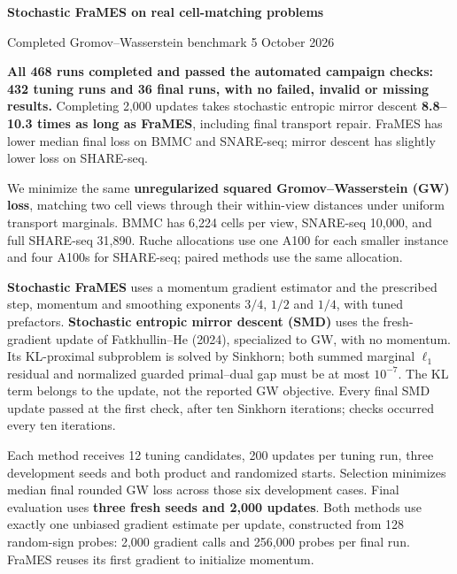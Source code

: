 \documentclass[11pt,a4paper]{article}
\begin{document}
{\color{ink}\fontsize{17}{20}\selectfont\bfseries Stochastic FraMES on real cell-matching problems\par}
{\small Completed Gromov--Wasserstein benchmark \hfill 5 October 2026\par}
\vspace{3pt}

\textbf{All 468 runs completed and passed the automated campaign checks: 432 tuning runs and 36 final runs, with no failed, invalid or missing results.} Completing 2,000 updates takes stochastic entropic mirror descent \textbf{8.8--10.3 times as long as FraMES}, including final transport repair. FraMES has lower median final loss on BMMC and SNARE-seq; mirror descent has slightly lower loss on SHARE-seq.

We minimize the same \textbf{unregularized squared Gromov--Wasserstein (GW) loss}, matching two cell views through their within-view distances under uniform transport marginals. BMMC has 6,224 cells per view, SNARE-seq 10,000, and full SHARE-seq 31,890. Ruche allocations use one A100 for each smaller instance and four A100s for SHARE-seq; paired methods use the same allocation.

\textbf{Stochastic FraMES} uses a momentum gradient estimator and the prescribed step, momentum and smoothing exponents $3/4$, $1/2$ and $1/4$, with tuned prefactors. \textbf{Stochastic entropic mirror descent (SMD)} uses the fresh-gradient update of Fatkhullin--He (2024), specialized to GW, with no momentum. Its KL-proximal subproblem is solved by Sinkhorn; both summed marginal $\ell_1$ residual and normalized guarded primal--dual gap must be at most $10^{-7}$. The KL term belongs to the update, not the reported GW objective. Every final SMD update passed at the first check, after ten Sinkhorn iterations; checks occurred every ten iterations.

Each method receives 12 tuning candidates, 200 updates per tuning run, three development seeds and both product and randomized starts. Selection minimizes median final rounded GW loss across those six development cases. Final evaluation uses \textbf{three fresh seeds and 2,000 updates}. Both methods use exactly one unbiased gradient estimate per update, constructed from 128 random-sign probes: 2,000 gradient calls and 256,000 probes per final run. FraMES reuses its first gradient to initialize momentum.
\end{document}
